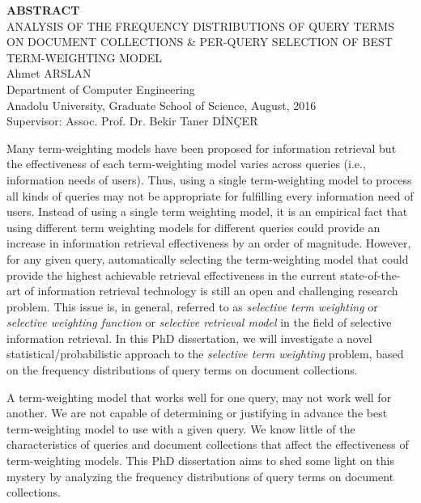 \newpage
{}
\begin{spacing}{1.2}
\begin{center}
\textbf{ABSTRACT} \vspace{4mm}\\
ANALYSIS OF THE FREQUENCY DISTRIBUTIONS OF QUERY TERMS ON DOCUMENT COLLECTIONS \& PER-QUERY SELECTION OF BEST TERM-WEIGHTING MODEL\\
\vspace{4mm}
Ahmet ARSLAN
\vspace{4mm} \\
Department of Computer Engineering \\
Anadolu University, Graduate School of Science, August, 2016 \\
\vspace{4mm}
Supervisor: Assoc. Prof. Dr. Bekir Taner D\.{I}N\c{C}ER \\
\end{center}
\vspace*{-1mm}

Many term-weighting models have been proposed for information retrieval but the effectiveness of each term-weighting model varies across queries (i.e., information needs of users). 
Thus, using a single term-weighting model to process all kinds of queries may not be appropriate for fulfilling every information need of users.
Instead of using a single term weighting model, it is an empirical fact that using different term weighting models for different queries could provide an increase in information retrieval effectiveness by an order of magnitude.
However, for any given query, automatically selecting the term-weighting model that could provide the highest achievable retrieval effectiveness in the current state-of-the-art of information retrieval technology is still an open and challenging research problem.
This issue is, in general, referred to as \emph{selective term weighting} or \emph{selective weighting function} or \emph{selective retrieval model} in the field of selective information retrieval.
In this PhD dissertation, we will investigate a novel statistical/probabilistic approach to the \emph{selective term weighting} problem, based on the frequency distributions of query terms on document collections.

A term-weighting model that works well for one query, may not work well for another. 
We are not capable of determining or justifying in advance the best term-weighting model to use with a given query.
We know little of the characteristics of queries and document collections that affect the effectiveness of term-weighting models.
This PhD dissertation aims to shed some light on this mystery by analyzing the frequency distributions of query terms on document collections.


\end{spacing}
